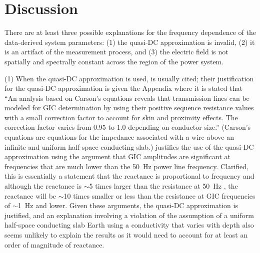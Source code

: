 \documentclass[draft,linenumbers]{agujournal2018}
\begin{document}

\section{Discussion}

There are at least three possible explanations for the frequency dependence of the data-derived system parameters: (1) the quasi-DC approximation is invalid, (2) it is an artifact of the measurement process, and (3) the electric field is not spatially and spectrally constant across the region of the power system. 

(1) When the quasi-DC approximation is used, \cite{Albertson1981} is usually cited; their justification for the quasi-DC approximation is given the Appendix where it is stated that ``An analysis based on Carson's equations reveals that transmission lines can be modeled for GIC determination by using their positive sequence resistance values with a small correction factor to account for skin and proximity effects. The correction factor varies from 0.95 to 1.0 depending on conductor size.'' (Carson's equations  \citep{Carson1926,Grigsby2007} are equations for the impedance associated with a wire above an infinite and uniform half-space conducting slab.) \cite{Lehtinen1985} justifies the use of the quasi-DC approximation using the argument that GIC amplitudes are significant at frequencies that are much lower than the 50~Hz power line frequency. Clarified, this is essentially a statement that the reactance is proportional to frequency and although the reactance is $\sim$5 times larger than the resistance at 50~Hz \citep{Purchala2005}, the reactance will be $\sim$10 times smaller or less than the resistance at GIC frequencies of $\sim$1~Hz and lower. Given these arguments, the quasi-DC approximation is justified, and an explanation involving a violation of the assumption of a uniform half-space conducting slab Earth using a conductivity that varies with depth also seems unlikely to explain the results as it would need to account for at least an order of magnitude of reactance.
\end{document}
